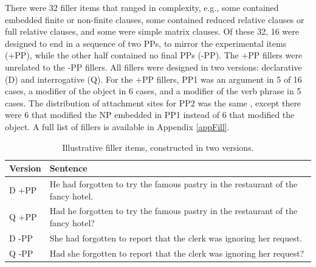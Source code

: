 \documentclass[12pt,oneside]{book}
\begin{document}
There were 32 filler items that ranged in complexity, e.g., some contained embedded finite or non-finite clauses, some contained reduced relative clauses or full relative clauses, and some were simple matrix clauses. Of these 32, 16 were designed to end in a sequence of two PPs, to mirror the experimental items (+PP), while the other half contained no final PPs (-PP). The +PP fillers were unrelated to the -PP fillers. All fillers were designed in two versions: declarative (D) and interrogative (Q). For the +PP fillers, PP1 was an argument in 5 of 16 cases, a modifier of the object in 6 cases, and a modifier of the verb phrase in 5 cases. The distribution of attachment sites for PP2  was the same , except there were 6 that modified the NP embedded in PP1 instead of 6 that modified the object.  A full list of fillers is available in Appendix \ref{appFill}.

\begin{table}[!h]

\caption{\label{tab:fsentences}Illustrative filler items, constructed in two versions.}
\centering
\begin{tabular}{ll}
\toprule
Version & Sentence\\
\midrule
D +PP & He had forgotten to try the famous pastry in the restaurant of the fancy hotel.\\
Q +PP & Had he forgotten to try the famous pastry in the restaurant of the fancy hotel?\\
\hline
\addlinespace
D -PP & She had forgotten to report that the clerk was ignoring her request.\\
Q -PP & Had she forgotten to report that the clerk was ignoring her request?\\
\bottomrule
\end{tabular}
\end{table}
\end{document}
